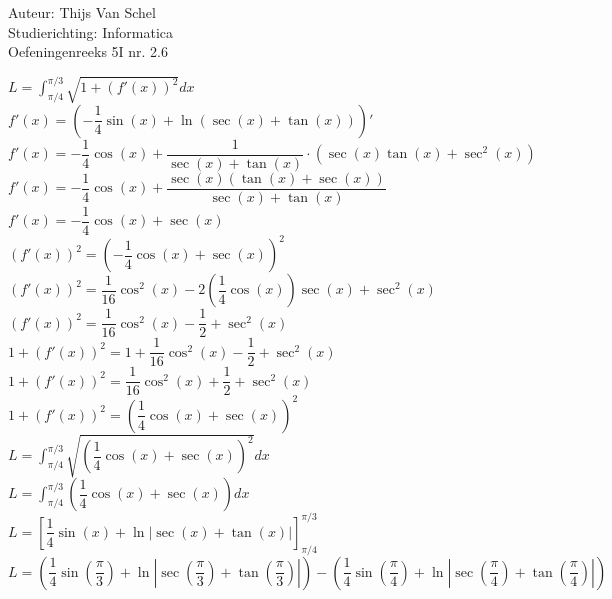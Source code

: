 \documentclass[a4paper]{article}
\newcommand{\dint}{\displaystyle\int}
\begin{document}
  
\noindent \large Auteur: Thijs Van Schel \\
\noindent \large Studierichting: Informatica\\
\noindent \large Oefeningenreeks 5I nr. 2.6\\

\medskip

\normalsize

$L = \dint_{\pi/4}^{\pi/3} \sqrt{1 + (f'(x))^2} dx$\\

$f'(x) = \left(-\dfrac{1}{4}\sin(x) + \ln(\sec(x)+\tan(x))\right)'$\\

$f'(x) = -\dfrac{1}{4}\cos(x) + \dfrac{1}{\sec(x)+\tan(x)} \cdot (\sec(x)\tan(x) + \sec^2(x))$\\

$f'(x) = -\dfrac{1}{4}\cos(x) + \dfrac{\sec(x)(\tan(x)+\sec(x))}{\sec(x)+\tan(x)}$\\

$f'(x) = -\dfrac{1}{4}\cos(x) + \sec(x)$\\

$(f'(x))^2 = \left(-\dfrac{1}{4}\cos(x) + \sec(x)\right)^2$\\

$(f'(x))^2 = \dfrac{1}{16}\cos^2(x) - 2\left(\dfrac{1}{4}\cos(x)\right)\sec(x) + \sec^2(x)$\\

$(f'(x))^2 = \dfrac{1}{16}\cos^2(x) - \dfrac{1}{2} + \sec^2(x)$\\

$1 + (f'(x))^2 = 1 + \dfrac{1}{16}\cos^2(x) - \dfrac{1}{2} + \sec^2(x)$\\

$1 + (f'(x))^2 = \dfrac{1}{16}\cos^2(x) + \dfrac{1}{2} + \sec^2(x)$\\

$1 + (f'(x))^2 = \left(\dfrac{1}{4}\cos(x) + \sec(x)\right)^2$\\

$L = \dint_{\pi/4}^{\pi/3} \sqrt{\left(\dfrac{1}{4}\cos(x) + \sec(x)\right)^2} dx$\\

$L = \dint_{\pi/4}^{\pi/3} \left(\dfrac{1}{4}\cos(x) + \sec(x)\right) dx$\\

$L = \left[ \dfrac{1}{4}\sin(x) + \ln|\sec(x)+\tan(x)| \right]_{\pi/4}^{\pi/3}$\\

$L = \left(\dfrac{1}{4}\sin\left(\dfrac{\pi}{3}\right) + \ln\left|\sec\left(\dfrac{\pi}{3}\right)+\tan\left(\dfrac{\pi}{3}\right)\right|\right) - \left(\dfrac{1}{4}\sin\left(\dfrac{\pi}{4}\right) + \ln\left|\sec\left(\dfrac{\pi}{4}\right)+\tan\left(\dfrac{\pi}{4}\right)\right|\right)$\\
\end{document}
